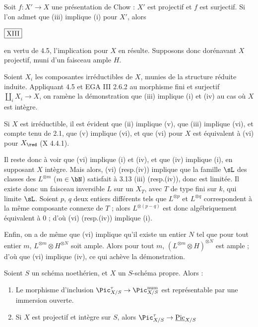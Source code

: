 Soit $f : X' \to X$ une présentation de Chow : $X'$ est projectif et $f$ est surjectif. Si l'on admet que (iii) implique (i) pour $X'$, alors

\begin{flushright}
$\fbox{\text{XIII}}$
\end{flushright}

\noindent
en vertu de 4.5, l'implication pour $X$ en résulte. Supposons donc dorénavant $X$ projectif, muni d'un faisceau ample $H$.

Soient $X_i$ les composantes irréductibles de $X$, munies de la structure réduite induite. Appliquant 4.5 et EGA III 2.6.2 au morphisme fini et surjectif $\coprod_i X_i \to X$, on ramène la démonstration que (iii) implique (i) et (iv) au cas où $X$ est intègre.

Si $X$ est irréductible, il est évident que (ii) implique (v), que (iii) implique (vi), et compte tenu de 2.1, que (v) implique (vi), et que (vi) pour $X$ est équivalent à (vi) pour $X_{\red}$ (X 4.4.1).

Il reste donc à voir que (vi) implique (i) et (iv), et que (iv) implique (i), en supposant $X$ intègre. Mais alors, (vi) (resp.\@ (iv)) implique que la famille $\sL$ des classes des $L^{\otimes m}$ ($m \in \bN$) satisfait à 3.13 (iii) (resp.\@ (iv)), donc est limitée. Il existe donc un faisceau inversible $L$ sur un $X_T$, avec $T$ de type fini sur $k$, qui limite $\sL$. Soient $p$, $q$ deux entiers différents tels que $L^{\otimes p}$ et $L^{\otimes q}$ correspondent à la même composante connexe de $T$ ; alors $L^{\otimes (p-q)}$ est donc algébriquement équivalent à $0$ ; d'où (vi) (resp.\@ (iv)) implique (i).

Enfin, on a de même que (vi) implique qu'il existe un entier $N$ tel que pour tout entier $m$, $L^{\otimes m} \otimes H^{\otimes N}$ soit ample. Alors pour tout $m$, $(L^{\otimes m} \otimes H)^{\otimes N}$ est ample ; d'où que (vi) implique (iv), ce qui achève la démonstration.

\begin{thm}\label{thm:4.7} Soient $S$ un schéma noethérien, et $X$ un $S$-schéma propre. Alors :
\begin{enumerate}[label={\roman*)}]
\item Le morphisme d'inclusion $\Pic^{\tau}_{X/S} \to \Pic^{\mathrm{num}}_{X/S}$ est représentable par une immersion ouverte.
\item Si $X$ est projectif et intègre sur $S$, alors $\Pic^{\tau}_{X/S} \to \underline{\operatorname{Pic}}_{X/S}$
\end{enumerate}
\end{thm}

